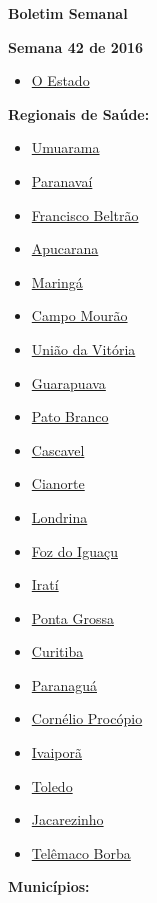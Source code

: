 \documentclass[10pt]{article} %
\begin{document}
\begin{minipage}[t]{.30\linewidth} %
\begin{mdframed}[style=sidebar,frametitle={}] %


\hypertarget{contents}{\textbf{{\large Boletim Semanal}}} 

\textbf{Semana 42 de 2016} %

\begin{itemize}
\item \hyperlink{estado}{O Estado} 
\end{itemize}


\textbf{Regionais de Saúde:}


\begin{itemize}\item \hyperlink{Umrm}{Umuarama}
\item \hyperlink{Prnv}{Paranavaí}
\item \hyperlink{FrnB}{Francisco Beltrão}
\item \hyperlink{Apcr}{Apucarana}
\item \hyperlink{Mrng}{Maringá}
\item \hyperlink{CmpM}{Campo Mourão}
\item \hyperlink{UndV}{União da Vitória}
\item \hyperlink{Grpv}{Guarapuava}
\item \hyperlink{PtBr}{Pato Branco}
\item \hyperlink{Cscv}{Cascavel}
\item \hyperlink{Cnrt}{Cianorte}
\item \hyperlink{Lndr}{Londrina}
\item \hyperlink{FzdI}{Foz do Iguaçu}
\item \hyperlink{Irat}{Iratí}
\item \hyperlink{PntG}{Ponta Grossa}
\item \hyperlink{Crtb}{Curitiba}
\item \hyperlink{Prng}{Paranaguá}
\item \hyperlink{CrnP}{Cornélio Procópio}
\item \hyperlink{Ivpr}{Ivaiporã}
\item \hyperlink{Told}{Toledo}
\item \hyperlink{Jcrz}{Jacarezinho}
\item \hyperlink{TlmB}{Telêmaco Borba}\end{itemize}
\textbf{Municípios:}


\end{mdframed}
\end{minipage}
\end{document}
